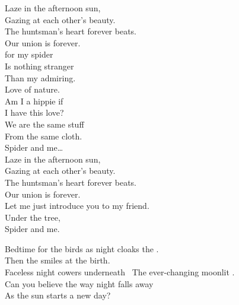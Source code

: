 Laze in the afternoon sun, \\
Gazing at each other's beauty. \\
The huntsman's heart forever beats. \\
Our union is forever. \\

 for my spider \\
Is nothing stranger \\
Than my admiring. \\
Love of nature. \\
Am I a hippie if \\
I have this love? \\
We are the same stuff \\
From the same cloth. \\

Spider and me… \\

Laze in the afternoon sun, \\
Gazing at each other's beauty. \\
The huntsman's heart forever beats. \\
Our union is forever. \\

Let me just introduce you to my friend. \\
Under the tree, \\
Spider and me. \\









Bedtime for the birds as night cloaks the . \\
Then the  smiles at the  birth. \\
Faceless night cowers underneath \
The ever-changing moonlit . \\
Can you believe the way night falls away \\
As the sun starts a new day? \\

